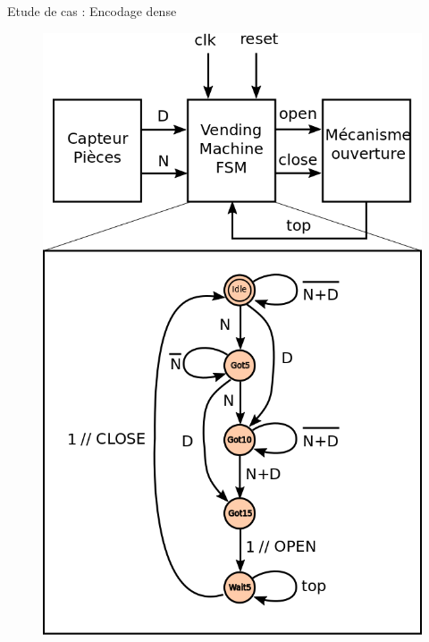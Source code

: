 \documentclass[xcolor=table]{beamer}
\begin{document}
\begin{frame}{Etude de cas : Encodage dense}

  \begin{minipage}{0.4\textwidth}

    \begin{figure}[h]
      \centering
      \includegraphics[scale=0.18]{../../POLY/figures/vending_machine.png}
      \label{fig:vending_machine}
    \end{figure}
  \end{minipage}
  \begin{minipage}{0.4\textwidth}
    \begin{table}

\end{table}
\end{minipage}
\end{frame}
\end{document}

